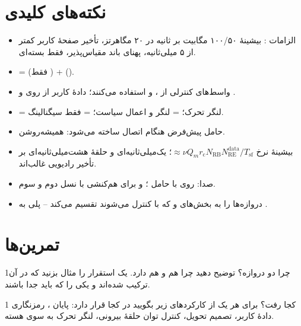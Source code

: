 \documentclass[11pt,a4paper]{article}
\begin{document}
\section{نکته‌های کلیدی}
\begin{takeawaybox}
\begin{itemize}
  \item الزامات : بیشینهٔ ۱۰۰/۵۰ مگابیت بر ثانیه در ۲۰ مگاهرتز، تأخیر صفحهٔ کاربر کمتر از ۵
        میلی‌ثانیه، پهنای باند مقیاس‌پذیر، فقط بسته‌ای.
  \item {} =  (فقط ) +  ().
  \item واسط‌های کنترلی از ،  و  استفاده می‌کنند؛ دادهٔ کاربر از
         روی  و .
  \item {} = لنگر تحرک؛  = لنگر  و اعمال سیاست؛  = فقط سیگنالینگ.
  \item حامل پیش‌فرض  هنگام اتصال ساخته می‌شود:  همیشه‌روشن.
  \item بیشینهٔ نرخ $\approx\nu Q_m r_\mathrm{c} N_{\mathrm{RB}} N_{\mathrm{RE}}^{\mathrm{data}}/T_{\mathrm{sf}}$؛
         یک‌میلی‌ثانیه‌ای و حلقهٔ  هشت‌میلی‌ثانیه‌ای بر تأخیر رادیویی غالب‌اند.
  \item صدا:  روی  با حامل ؛  و  برای هم‌کنشی با نسل دوم و سوم.
  \item {} دروازه‌ها را به بخش‌های  و  که با  کنترل می‌شوند تقسیم می‌کند -- پلی به .
\end{itemize}
\end{takeawaybox}

\section{تمرین‌ها}

\begin{exercisebox}{1}{چرا دو دروازه؟}\label{exr:twogw}
توضیح دهید چرا  هم  و هم  دارد. یک استقرار را مثال بزنید که در آن ترکیب
شده‌اند و یکی را که باید جدا باشند.
\end{exercisebox}

\begin{exercisebox}{1}{ کجا رفت؟}\label{exr:rnc}
برای هر یک از کارکردهای زیر  بگویید در  کجا قرار دارد: پایان ، رمزنگاری
دادهٔ کاربر، تصمیم تحویل، کنترل توان حلقهٔ بیرونی، لنگر تحرک به سوی هسته.
\end{exercisebox}
\end{document}
